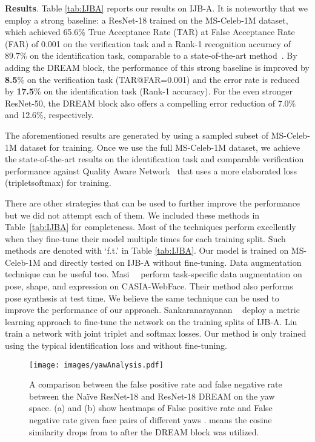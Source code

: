 \documentclass[10pt,twocolumn,letterpaper]{article}
\begin{document}
\noindent
\textbf{Results}.
Table \ref{tab:IJBA} reports our results on IJB-A. It is noteworthy that we employ a strong baseline: a ResNet-18 trained on the MS-Celeb-1M dataset, which achieved 65.6\% True Acceptance Rate (TAR) at False Acceptance Rate (FAR) of 0.001 on the verification task and a Rank-1 recognition accuracy of 89.7\% on the identification task, comparable to a state-of-the-art method~\cite{chen2016unconstrained}.
By adding the DREAM block, the performance of this strong baseline is improved by \textbf{8.5}\% on the verification task (TAR@FAR=0.001) and the error rate is reduced by \textbf{17.5}\% on the identification task (Rank-1 accuracy). For the even stronger ResNet-50, the DREAM block also offers a compelling error reduction of 7.0\% and 12.6\%, respectively.

The aforementioned results are generated by using a sampled subset of MS-Celeb-1M dataset for training. Once we use the full MS-Celeb-1M dataset, we achieve the state-of-the-art results on the identification task and comparable verification performance against Quality Aware Network~\cite{liu2017quality} that uses a more elaborated loss (tripletsoftmax) for training.



There are other strategies that can be used to further improve the performance but we did not attempt each of them.
We included these methods in Table~\ref{tab:IJBA} for completeness.
Most of the techniques perform excellently when they fine-tune their model multiple times for each training split. Such methods are denoted with `f.t.' in Table \ref{tab:IJBA}. Our model is trained on MS-Celeb-1M and directly tested on IJB-A without fine-tuning.
Data augmentation technique can be useful too. Masi~\etal~\cite{masi2016we} perform task-specific data augmentation on pose, shape, and expression on CASIA-WebFace. Their method also performs pose synthesis at test time. We believe the same technique can be used to improve the performance of our approach.
Sankaranarayanan \etal~\cite{sankaranarayanan2017triplet} deploy a metric learning approach to fine-tune the network on the training splits of IJB-A. Liu \etal~\cite{liu2017quality} train a network with joint triplet and softmax losses.
Our method is only trained using the typical identification loss and without fine-tuning.






\begin{figure}[t]
\centering
\texttt{[image: images/yawAnalysis.pdf]}
\caption{A comparison between the false positive rate and false negative rate between the Na\"{i}ve ResNet-18 and ResNet-18  DREAM on the yaw space. (a) and (b) show heatmaps of False positive rate and False negative rate given face pairs of different yaws .
 means the cosine similarity drops from  to  after the DREAM block was utilized.}
\label{fig:yawAnalysis}
\vskip -0.4cm
\end{figure}
\end{document}
